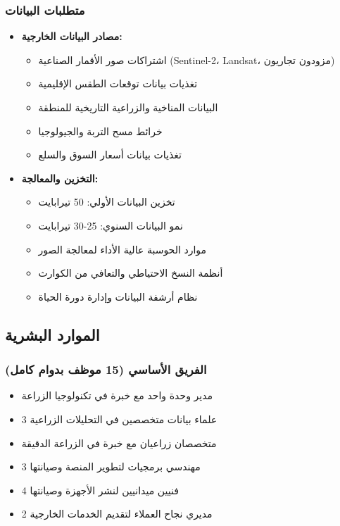\subsubsection{متطلبات البيانات}
\begin{itemize}
    \item \textbf{مصادر البيانات الخارجية:}
    \begin{itemize}
        \item اشتراكات صور الأقمار الصناعية (Sentinel-2، Landsat، مزودون تجاريون)
        \item تغذيات بيانات توقعات الطقس الإقليمية
        \item البيانات المناخية والزراعية التاريخية للمنطقة
        \item خرائط مسح التربة والجيولوجيا
        \item تغذيات بيانات أسعار السوق والسلع
    \end{itemize}
    
    \item \textbf{التخزين والمعالجة:}
    \begin{itemize}
        \item تخزين البيانات الأولي: 50 تيرابايت
        \item نمو البيانات السنوي: 25-30 تيرابايت
        \item موارد الحوسبة عالية الأداء لمعالجة الصور
        \item أنظمة النسخ الاحتياطي والتعافي من الكوارث
        \item نظام أرشفة البيانات وإدارة دورة الحياة
    \end{itemize}
\end{itemize}

\subsection{الموارد البشرية}

\subsubsection{الفريق الأساسي (15 موظف بدوام كامل)}
\begin{itemize}
    \item مدير وحدة واحد مع خبرة في تكنولوجيا الزراعة
    \item 3 علماء بيانات متخصصين في التحليلات الزراعية
    \item متخصصان زراعيان مع خبرة في الزراعة الدقيقة
    \item 3 مهندسي برمجيات لتطوير المنصة وصيانتها
    \item 4 فنيين ميدانيين لنشر الأجهزة وصيانتها
    \item 2 مديري نجاح العملاء لتقديم الخدمات الخارجية
\end{itemize}

